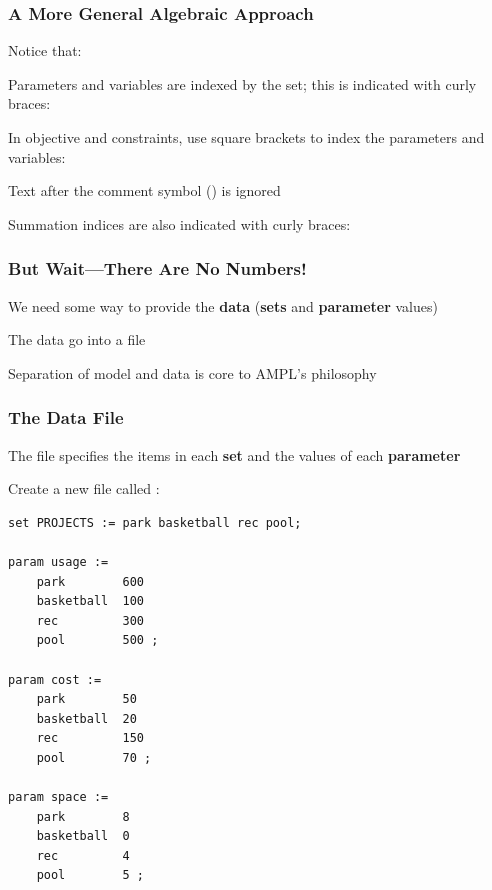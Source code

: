 \begin{frame}[fragile]

	\frametitle{A More General Algebraic Approach}
	


	\bit
	\item Notice that:
		\bit
		\item Parameters and variables are indexed by the set; this is indicated with curly braces: 
		\item In objective and constraints, use square brackets to index the parameters and variables: 
		\item Text after the comment symbol (\myinline{\#}) is ignored
		\item Summation indices are also indicated with curly braces: 
		\eit
	\eit

\end{frame}

\begin{frame}[fragile]

	\frametitle{But Wait---There Are No Numbers!}
	


	\bit
	\item We need some way to provide the {\bf data} ({\bf sets} and {\bf parameter} values)
	\item The data go into a  file
	\item Separation of model and data is core to AMPL's philosophy
	\eit

\end{frame}


\begin{frame}[fragile]

	\frametitle{The Data File}
	
	\bit
	\item The  file specifies the items in each {\bf set} and the values of each {\bf parameter}
	\item Create a new file called :
	\eit
	
\begin{lstlisting}
set PROJECTS := park basketball rec pool;

param usage :=
	park		600
	basketball	100
	rec			300
	pool		500 ;
	
param cost :=
	park		50
	basketball	20
	rec			150
	pool		70 ;
	
param space :=
	park		8
	basketball	0
	rec			4
	pool		5 ;
\end{lstlisting}

\end{frame}

